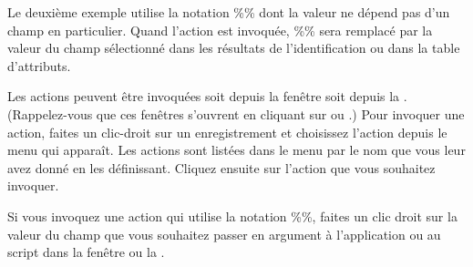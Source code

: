Le deuxi\`eme exemple utilise la notation \%\% dont la valeur ne d\'epend pas d'un champ en particulier. Quand l'action est invoqu\'ee, \%\% sera remplac\'e par la valeur du champ s\'electionn\'e dans les r\'esultats de l'identification ou dans la table d'attributs.

\label{label_usingactions}
Les actions peuvent \^etre invoqu\'ees soit depuis la fen\^etre  soit depuis la . (Rappelez-vous que ces fen\^etres s'ouvrent en cliquant sur  ou .)
Pour invoquer une action, faites un clic-droit sur un enregistrement et choisissez l'action depuis le menu qui appara\^it. Les actions sont list\'ees dans le menu par le nom que vous leur avez donn\'e en les d\'efinissant. Cliquez ensuite sur l'action que vous souhaitez invoquer.

Si vous invoquez une action qui utilise la notation \%\%, faites un clic droit sur la valeur du champ que vous souhaitez passer en argument \`a l'application ou au script dans la fen\^etre  ou la .

